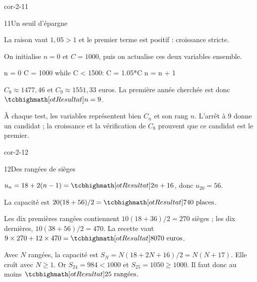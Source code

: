 \begin{blocLivre}{cor-2-11}
\begin{corrige}{11}{Un seuil d'épargne}
\begin{questions}
\item La raison vaut $1{,}05>1$ et le premier terme est positif : croissance stricte.
\item On initialise $n=0$ et $C=1000$, puis on actualise ces deux variables ensemble.
\end{questions}
\begin{python}
n = 0
C = 1000
while C < 1500:
    C = 1.05*C
    n = n + 1
\end{python}
\enspace $C_8\approx1477{,}46$ et $C_9\approx1551{,}33$ euros.
La première année cherchée est donc $\res{n=9}$.

À chaque test, les variables représentent bien $C_n$ et son rang $n$. L’arrêt à 9 donne un candidat ; la croissance et la vérification de $C_8$ prouvent que ce candidat est le premier.

\end{corrige}
\end{blocLivre}
\begin{blocLivre}{cor-2-12}
\begin{corrige}{12}{Des rangées de sièges}
\begin{questions}
\item {}
$u_n=18+2(n-1)=\res{2n+16}$, donc $u_{20}=56$.
\item La capacité est $20(18+56)/2=\res{740\text{ places}}$.
\item Les dix premières rangées contiennent $10(18+36)/2=270$ sièges ;
les dix dernières, $10(38+56)/2=470$.
La recette vaut $9\times270+12\times470=\res{8070\text{ euros}}$.
\item Avec $N$ rangées, la capacité est $S_N=N(18+2N+16)/2=N(N+17)$.
Elle croît avec $N\geq1$. Or $S_{24}=984<1000$ et $S_{25}=1050\geq1000$.
Il faut donc au moins $\res{25\text{ rangées}}$.
\end{questions}
\end{corrige}
\end{blocLivre}
